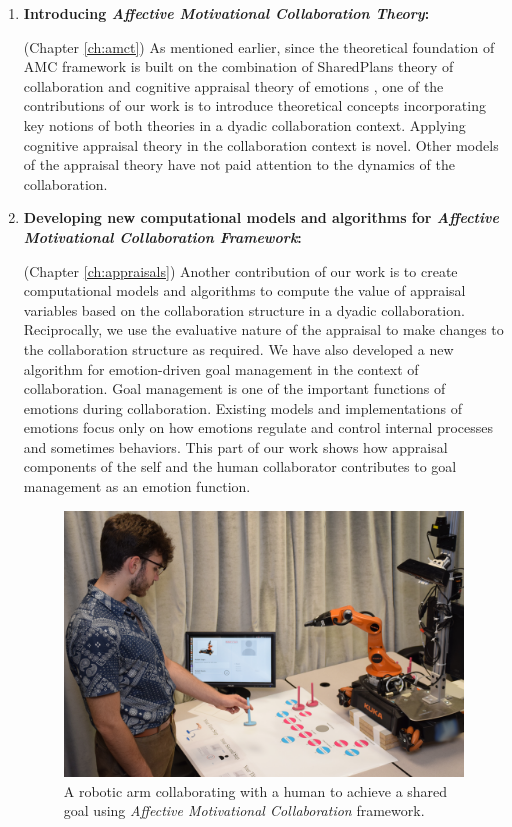 \documentclass[12pt]{report}
\begin{document}
\begin{enumerate}
  \item \textbf{Introducing \textit{Affective Motivational Collaboration Theory}:}
    
  	(Chapter \ref{ch:amct}) As mentioned earlier, since the theoretical
  	foundation of AMC framework is built on the combination of SharedPlans
  	theory of collaboration \cite{grosz:plans-discourse} and cognitive appraisal
  	theory of emotions \cite{marsella:ema-process-model}
  	\cite{scherer:appraisal-processes}, one of the contributions of our work is
  	to introduce theoretical concepts incorporating key notions of both theories
  	in a dyadic collaboration context. Applying cognitive appraisal theory in the
  	collaboration context is novel. Other models of the appraisal theory have not
  	paid attention to the dynamics of the collaboration.
	
  \item \textbf{Developing new computational models and algorithms for
  \textit{Affective Motivational Collaboration Framework}:}
  
	(Chapter \ref{ch:appraisals}) Another contribution of our work is to create
	computational models and algorithms to compute the value of appraisal variables
	based on the collaboration structure in a dyadic collaboration. Reciprocally,
	we use the evaluative nature of the appraisal to make changes to the
	collaboration structure as required. We have also developed a new algorithm for
	emotion-driven goal management in the context of collaboration. Goal management
	is one of the important functions of emotions during collaboration. Existing
	models and implementations of emotions focus only on how emotions regulate and
	control internal processes and sometimes behaviors. This part of our work shows
	how appraisal components of the self and the human collaborator contributes to
	goal management as an emotion function.
  
  \begin{figure}
    \centering
    \includegraphics[scale=1.17]{figure/collaborative-robot.png}
    \caption{A robotic arm collaborating with a human to achieve a shared goal
    using \textit{Affective Motivational Collaboration} framework.}
    \label{fig:collaborative-robot}
  \end{figure}
  

\end{enumerate}
\end{document}
